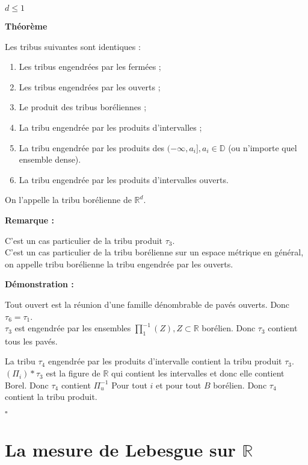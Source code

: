 \documentclass[10pt,a4paper,notitlepage ]{report}
\newcommand{\R}{\mathbb R}
\newcounter{th}
\newenvironment{theorem}[1][]{
\refstepcounter{th}
\begin{tcolorbox}
	\textbf{Théorème \theth \ #1}
	
	
}{\end{tcolorbox}}
\newenvironment{demo}[1][]{

	\textbf{Démonstration #1 :}
}{\begin{flushright}
	$\square$
\end{flushright}
}
\newenvironment{rem}{
	
	\textbf{Remarque :}}{}
\begin{document}
$d \leq 1 $ \\

\begin{theorem}
Les tribus suivantes sont identiques :
\begin{enumerate}
\item Les tribus engendrées par les fermées ;
\item Les tribus engendrées par les ouverts ;
\item Le produit des tribus boréliennes ;
\item La tribu engendrée par les produits d'intervalles ;
\item La tribu engendrée par les produits des $( - \infty , a_i ], a_i \in \mathbb{D} $ (ou n'importe quel ensemble dense).
\item La tribu engendrée par les produits d'intervalles ouverts. 
\end{enumerate}

On l'appelle la tribu borélienne de $\R ^d $.

\end{theorem}

\begin{rem}

C'est un cas particulier de la tribu produit $\tau _3 $. \\
C'est un cas particulier de la tribu borélienne sur un espace métrique en général, on appelle tribu borélienne la tribu engendrée par les ouverts.

\end{rem}

\begin{demo}

Tout ouvert est la réunion d'une famille dénombrable de pavés ouverts. Donc $\tau _6 = \tau _1 $.  \\

$\tau _3$ est engendrée par les ensembles  $\prod _1 ^{-1} (Z) , Z \subset \mathbb{R}$ borélien. Donc $\tau _3$ contient tous les pavés.

La tribu $\tau _4 $ engendrée par les produits d'intervalle contient la tribu produit $\tau _3$. \\

$( \Pi _i ) * \tau _3 $ est la figure de $\mathbb{R}$ qui contient les intervalles et donc elle contient Borel. Donc $\tau _4$ contient $\Pi _u^{-1} $ Pour tout $i$ et pour tout $B$ borélien. Donc $\tau _4$ contient la tribu produit.
\end{demo}

\section{La mesure de Lebesgue sur $\R$}
\end{document}
